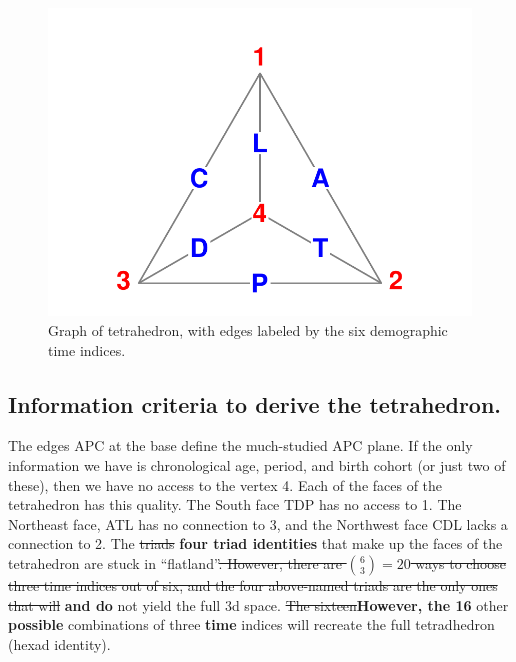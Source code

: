\documentclass[12pt,oneside,letter]{article} %
\begin{document}
\begin{figure}[h!]
\centering
\caption{Graph of tetrahedron, with edges labeled by the six demographic time
indices.}
\label{fig:tet}
\includegraphics[scale=1]{Figures/TetraHedronVerticesEdges.pdf}
\end{figure}

\subsection*{Information criteria to derive the tetrahedron.}
The edges APC at the base define the much-studied APC plane. If the only
information we have is chronological age, period, and birth cohort (or just two
of these), then we have no access to the vertex 4. Each of the faces of the
tetrahedron has this quality. The South face TDP has no access to 1.
The Northeast face, ATL has no connection to 3, and the Northwest face
CDL lacks a connection to 2. The \sout{triads }\textbf{four triad identities }that make up the faces of
the tetrahedron are stuck in ``flatland''\sout{. However, there are $\binom{6}{3}=20$ ways to choose three time indices out of six, and the four
above-named triads are the only ones that will} \textbf{and do }not yield the full 3d
space. \sout{The sixteen}\textbf{However, the 16} other \textbf{possible }combinations of three \textbf{time }indices will recreate the full tetradhedron (hexad identity).



\end{document}
